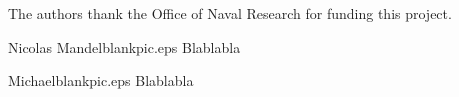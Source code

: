 \documentclass[twocolumn,letterpaper]{IEEEAerospaceCLS}  %
\begin{document}
\acknowledgments
The authors thank the Office of Naval Research for funding this project.







\thebiography
\begin{biographywithpic}{Nicolas Mandel}{blankpic.eps}
    Blablabla
\end{biographywithpic}

\begin{biographywithpic}{Michael}{blankpic.eps}
    Blablabla
\end{biographywithpic}
\end{document}
